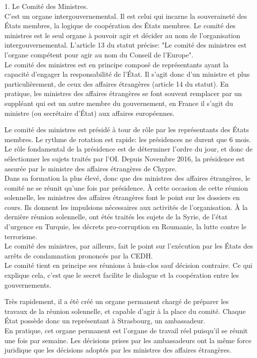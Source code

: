 \documentclass[10pt, a4paper, openany]{book}
\begin{document}
1. Le Comité des Ministres. \\
C'est un organe intergouvernemental. Il est celui qui incarne la souveraineté des États membres, la logique de coopération des États membres. Le comité des ministres est le seul organe à pouvoir agir et décider au nom de l'organisation intergouvernemental. L'article 13 du statut précise: "Le comité des ministres est l'organe compétent pour agir au nom du Conseil de l'Europe". \\
Le comité des ministres est en principe composé de représentants ayant la capacité d'engager la responsabilité de l'État. Il s'agit donc d'un ministre et plus particulièrement, de ceux des affaires étrangères (article 14 du statut). En pratique, les ministres des affaires étrangères se font souvent remplacer par un suppléant qui est un autre membre du gouvernement, en France il s'agit du ministre (ou secrétaire d'État) aux affaires européennes.


Le comité des ministres est présidé à tour de rôle par les représentants des États membres. Le rythme de rotation est rapide: les présidences ne durent que 6 mois. Le rôle fondamental de la présidence est de déterminer l'ordre du jour, et donc de sélectionner les sujets traités par l'OI. Depuis Novembre 2016, la présidence est assurée par le ministre des affaires étrangères de Chypre. \\
Dans sa formation la plus élevé, donc que des ministres des affaires étrangères, le comité ne se réunit qu'une fois par présidence. À cette occasion de cette réunion solennelle, les ministres des affaires étrangères font le point sur les dossiers en cours. Ils donnent les impulsions nécessaires aux activités de l'organisation. À la dernière réunion solennelle, ont étés traités les sujets de la Syrie, de l'état d'urgence en Turquie, les décrets pro-corruption en Roumanie, la lutte contre le terrorisme. \\
Le comité des ministres, par ailleurs, fait le point sur l'exécution par les États des arrêts de condamnation prononcés par la CEDH. \\
Le comité tient en principe ses réunions à huis-clos sauf décision contraire. Ce qui explique cela, c'est que le secret facilite le dialogue et la coopération entre les gouvernements. 


Très rapidement, il a été créé un organe permanent chargé de préparer les travaux de la réunion solennelle, et capable d'agir à la place du comité. Chaque État possède donc un représentant à Strasbourg, un ambassadeur. \\
En pratique, cet organe permanent est l'organe de travail réel puisqu'il se réunit une fois par semaine. Les décisions prises par les ambassadeurs ont la même force juridique que les décisions adoptés par les ministres des affaires étrangères. 
\end{document}
